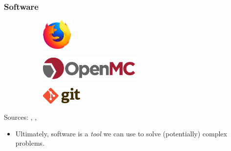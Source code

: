 \begin{frame}
  \frametitle{Software}
  \begin{figure}[htpb]
      \centering
      \begin{subfigure}
        \centering
        \includegraphics[width=1.5cm]{images/firefox-logo.eps}
      \end{subfigure}
      \begin{subfigure}
        \centering
        \includegraphics[width=5cm]{images/openmc-logo.eps}
      \end{subfigure}
      \begin{subfigure}
        \centering
        \includegraphics[width=2cm]{images/git-logo.eps}
      \end{subfigure}
  \end{figure}
  \begin{center}
    {\tiny Sources: \cite{firefox_logo}, \cite{openmc_logo}, \cite{git_logo}}
  \end{center}
  \begin{itemize}
      \item Ultimately, software is a {\it tool} we can use to solve (potentially) complex problems.
  \end{itemize}
\end{frame}

